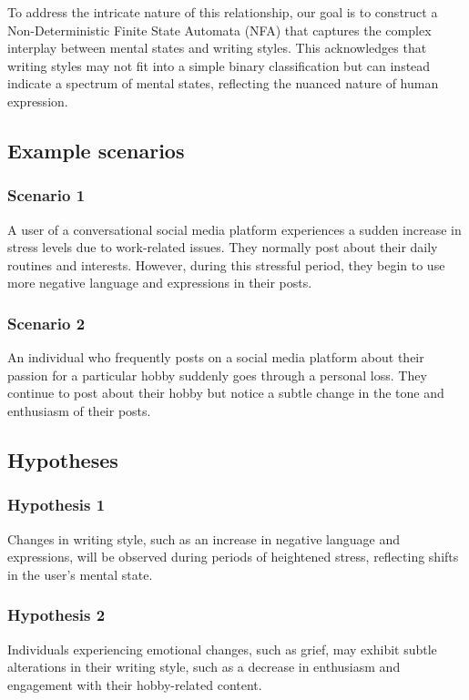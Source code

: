 \documentclass[conference,compsoc]{IEEEtran}
\begin{document}
To address the intricate nature of this relationship, our goal is to construct a Non-Deterministic Finite State Automata (NFA) that captures the complex interplay between mental states and writing styles. This acknowledges that writing styles may not fit into a simple binary classification but can instead indicate a spectrum of mental states, reflecting the nuanced nature of human expression.

\subsection{Example scenarios}
\subsubsection{Scenario 1}
A user of a conversational social media platform experiences a sudden increase in stress levels due to work-related issues. They normally post about their daily routines and interests. However, during this stressful period, they begin to use more negative language and expressions in their posts.

\subsubsection{Scenario 2}
An individual who frequently posts on a social media platform about their passion for a particular hobby suddenly goes through a personal loss. They continue to post about their hobby but notice a subtle change in the tone and enthusiasm of their posts.

\subsection{Hypotheses}
\subsubsection{Hypothesis 1}
Changes in writing style, such as an increase in negative language and expressions, will be observed during periods of heightened stress, reflecting shifts in the user's mental state.

\subsubsection{Hypothesis 2}
Individuals experiencing emotional changes, such as grief, may exhibit subtle alterations in their writing style, such as a decrease in enthusiasm and engagement with their hobby-related content.
\end{document}
